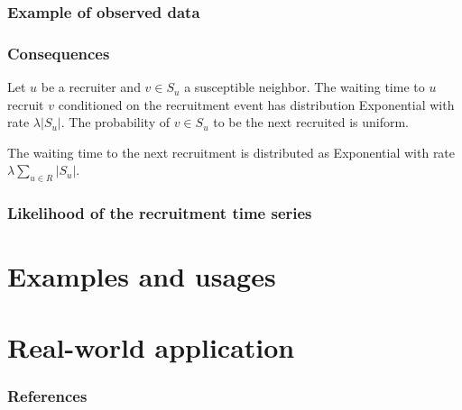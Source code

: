 \documentclass{beamer}
\begin{document}
\begin{frame}

  \frametitle{Example of observed data}

\end{frame}

\begin{frame}
  
  \frametitle{Consequences}

  \begin{theorem}
    Let $u$ be a recruiter and $v \in S_u$ a susceptible neighbor. The waiting
    time to $u$ recruit $v$ conditioned on the recruitment event has
    distribution Exponential with rate $\lambda |S_u|$. The probability of $v
    \in S_u$ to be the next recruited is uniform.  
  \end{theorem}

  \begin{theorem}
    The waiting time to the next recruitment is distributed as Exponential
    with rate $\lambda \sum_{u \in R} |S_u|$.  
  \end{theorem}

\end{frame}

\begin{frame}
  
  \frametitle{Likelihood of the recruitment time series}

\end{frame}
  
\section{Examples and usages}

\section{Real-world application}

\begin{frame}[t, allowframebreaks]
   \frametitle{References}
   
   
 \end{frame}
\end{document}
